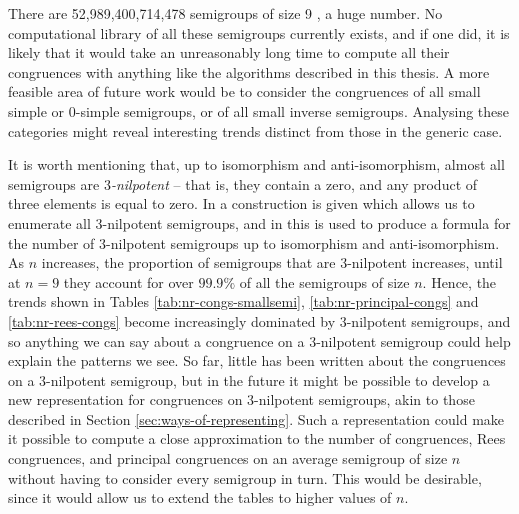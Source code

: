 There are 52,989,400,714,478 semigroups of size 9 \cite{order_nine}, a huge
number.  No computational library of all these semigroups currently exists, and
if one did, it is likely that it would take an unreasonably long time to compute
all their congruences with anything like the algorithms described in this
thesis.  A more feasible area of future work would be to consider the
congruences of all small simple or 0-simple semigroups, or of all small inverse
semigroups.  Analysing these categories might reveal interesting trends distinct
from those in the generic case.

It is worth mentioning that, up to isomorphism and anti-isomorphism, almost all
semigroups are \textit{$3$-nilpotent} -- that is, they contain a zero, and any
product of three elements is equal to zero.  In \cite{kleitman_1976} a
construction is given which allows us to enumerate all $3$-nilpotent semigroups,
and in \cite[\S2.3]{distler_thesis} this is used to produce a formula for the
number of $3$-nilpotent semigroups up to isomorphism and anti-isomorphism.  As
$n$ increases, the proportion of semigroups that are $3$-nilpotent increases,
until at $n=9$ they account for over $99.9\%$ of all the semigroups of size $n$.
Hence, the trends shown in Tables \ref{tab:nr-congs-smallsemi},
\ref{tab:nr-principal-congs} and \ref{tab:nr-rees-congs} become increasingly
dominated by $3$-nilpotent semigroups, and so anything we can say about a
congruence on a $3$-nilpotent semigroup could help explain the patterns we see.
So far, little has been written about the congruences on a $3$-nilpotent
semigroup, but in the future it might be possible to develop a new
representation for congruences on $3$-nilpotent semigroups, akin to those
described in Section \ref{sec:ways-of-representing}.  Such a representation
could make it possible to compute a close approximation to the number of
congruences, Rees congruences, and principal congruences on an average semigroup
of size $n$ without having to consider every semigroup in turn.  This would be
desirable, since it would allow us to extend the tables to higher values of $n$.
